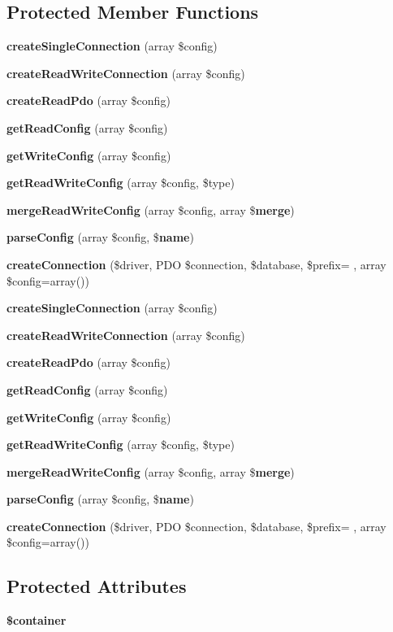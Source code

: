 \subsection*{Protected Member Functions}
\begin{DoxyCompactItemize}
\item 
{\bf create\+Single\+Connection} (array \$config)
\item 
{\bf create\+Read\+Write\+Connection} (array \$config)
\item 
{\bf create\+Read\+Pdo} (array \$config)
\item 
{\bf get\+Read\+Config} (array \$config)
\item 
{\bf get\+Write\+Config} (array \$config)
\item 
{\bf get\+Read\+Write\+Config} (array \$config, \$type)
\item 
{\bf merge\+Read\+Write\+Config} (array \$config, array \${\bf merge})
\item 
{\bf parse\+Config} (array \$config, \${\bf name})
\item 
{\bf create\+Connection} (\$driver, P\+D\+O \$connection, \$database, \$prefix= \textquotesingle{}\textquotesingle{}, array \$config=array())
\item 
{\bf create\+Single\+Connection} (array \$config)
\item 
{\bf create\+Read\+Write\+Connection} (array \$config)
\item 
{\bf create\+Read\+Pdo} (array \$config)
\item 
{\bf get\+Read\+Config} (array \$config)
\item 
{\bf get\+Write\+Config} (array \$config)
\item 
{\bf get\+Read\+Write\+Config} (array \$config, \$type)
\item 
{\bf merge\+Read\+Write\+Config} (array \$config, array \${\bf merge})
\item 
{\bf parse\+Config} (array \$config, \${\bf name})
\item 
{\bf create\+Connection} (\$driver, P\+D\+O \$connection, \$database, \$prefix= \textquotesingle{}\textquotesingle{}, array \$config=array())
\end{DoxyCompactItemize}
\subsection*{Protected Attributes}
\begin{DoxyCompactItemize}
\item 
{\bf \$container}
\end{DoxyCompactItemize}



